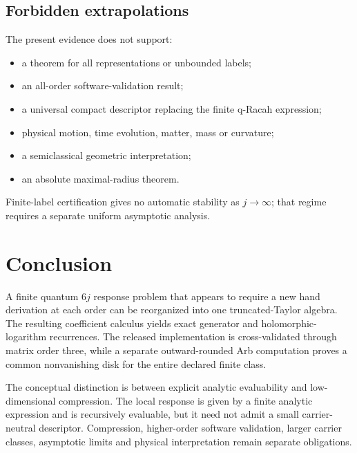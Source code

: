 \subsection{Forbidden extrapolations}
The present evidence does not support:
\begin{itemize}[leftmargin=2em]
\item a theorem for all representations or unbounded labels;
\item an all-order software-validation result;
\item a universal compact descriptor replacing the finite q-Racah expression;
\item physical motion, time evolution, matter, mass or curvature;
\item a semiclassical geometric interpretation;
\item an absolute maximal-radius theorem.
\end{itemize}
Finite-label certification gives no automatic stability as $j\to\infty$; that regime requires a separate uniform asymptotic analysis.

\section{Conclusion}
A finite quantum $6j$ response problem that appears to require a new hand derivation at each order can be reorganized into one truncated-Taylor algebra.  The resulting coefficient calculus yields exact generator and holomorphic-logarithm recurrences.  The released implementation is cross-validated through matrix order three, while a separate outward-rounded Arb computation proves a common nonvanishing disk for the entire declared finite class.

The conceptual distinction is between explicit analytic evaluability and low-dimensional compression.  The local response is given by a finite analytic expression and is recursively evaluable, but it need not admit a small carrier-neutral descriptor.  Compression, higher-order software validation, larger carrier classes, asymptotic limits and physical interpretation remain separate obligations.
